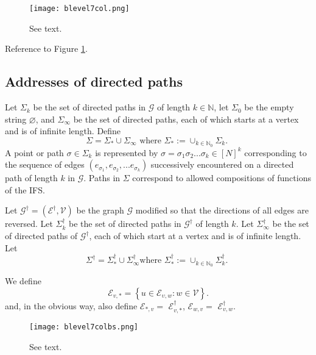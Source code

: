 \documentclass{amsproc}
\theoremstyle{plain}
\theoremstyle{definition}
\numberwithin{equation}{section}
\begin{document}
\begin{figure}[ptb]
\centering
\texttt{[image: blevel7col.png]}
\caption{See text.}
\label{blevel7col}
\end{figure}

Reference to Figure \ref{blevel7col}.

\subsection{Addresses of directed paths}

Let $\Sigma_{k}$ be the set of directed paths in $\mathcal{G}$ of length $%
k\in\mathbb{N}$, let $\Sigma_{0}$ be the empty string $\varnothing$, and $%
\Sigma_{\infty}$ be the set of directed paths, each of which starts at a
vertex and is of infinite length. Define 
\begin{equation*}
\Sigma=\Sigma_{\ast}\cup\Sigma_{\infty}\text{ where }\Sigma_{\ast}:=\cup
_{k\in\mathbb{N}_{0}}\Sigma_{k}\text{. }
\end{equation*}
A point or path $\sigma\in\Sigma_{k}$ is represented by $\sigma=\sigma
_{1}\sigma_{2}...\sigma_{k}\in\left[ N\right] ^{k}$ corresponding to the
sequence of edges $(e_{\sigma_{1}},e_{\sigma_{2}},...e_{\sigma_{k}})$
successively encountered on a directed path of length $k$ in $\mathcal{G}$.
Paths in $\Sigma$ correspond to allowed compositions of functions of the IFS.

Let $\mathcal{G}^{\dag}=(\mathcal{E}^{\dag},\mathcal{V})$ be the graph $%
\mathcal{G}$ modified so that the directions of all edges are reversed. Let $%
\Sigma_{k}^{\dag}$ be the set of directed paths in $\mathcal{G}^{\dag}$ of
length $k$. Let ${\Sigma}_{\infty}^{\dag}$ be the set of directed paths of $%
\mathcal{G}^{\dag}$, each of which start at a vertex and is of infinite
length. Let 
\begin{equation*}
{\Sigma}^{\dag}={\Sigma}_{\ast}^{\dag}\cup{\Sigma}_{\infty}^{\dag}\text{
where }{\Sigma}_{\ast}^{\dag}:=\cup_{k\in\mathbb{N}_{0}}{\Sigma}_{k}^{\dag}%
\text{. }
\end{equation*}

We define 
\begin{equation*}
\mathcal{E}_{v,\ast}=\left\{ u\in\mathcal{E}_{\upsilon,w}:w\in\mathcal{V}%
\right\} .
\end{equation*}
and, in the obvious way, also define $\mathcal{E}_{\ast,v}=$ $\mathcal{E}%
_{v,\ast}^{\dag}$, $\mathcal{E}_{w,v}=$ $\mathcal{E}_{v,w}^{\dag}$.

\begin{figure}[ptb]
\centering
\texttt{[image: blevel7colbs.png]}
\caption{See text.}
\label{blevel7colbs}
\end{figure}
\end{document}
